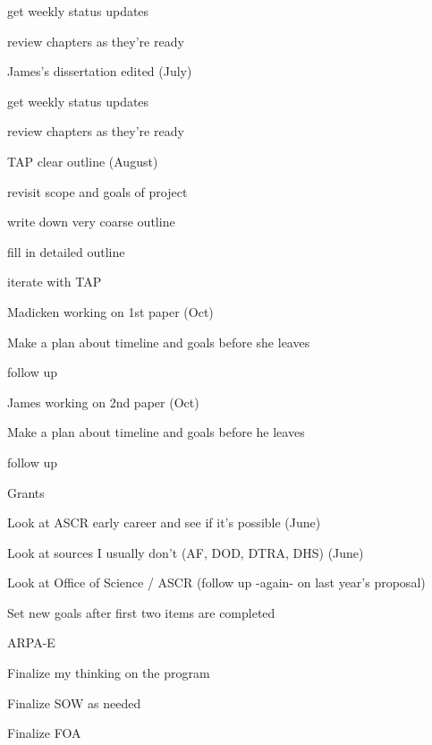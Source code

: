 \documentclass[12pt,twoside]{article}
\begin{document}
\begin{compactitem}
\begin{compactitem}
\begin{compactitem}
     \item get weekly status updates
     \item review chapters as they're ready
     \end{compactitem}
  \item James's dissertation edited (July)
     \begin{compactitem}
     \item get weekly status updates
     \item review chapters as they're ready
     \end{compactitem}
  \item TAP clear outline (August)
     \begin{compactitem}
     \item revisit scope and goals of project
     \item write down very coarse outline
     \item fill in detailed outline
     \item iterate with TAP
     \end{compactitem}
  \item Madicken working on 1st paper (Oct)
     \begin{compactitem}
     \item Make a plan about timeline and goals before she leaves
     \item follow up
     \end{compactitem}
  \item James working on 2nd paper (Oct)
     \begin{compactitem}
     \item Make a plan about timeline and goals before he leaves
     \item follow up
     \end{compactitem}
  \end{compactitem}

\item Grants
  \begin{compactitem}
  \item Look at ASCR early career and see if it's possible (June)
  \item Look at sources I usually don't (AF, DOD, DTRA, DHS) (June)
  \item Look at Office of Science / ASCR (follow up -again- on last year's proposal)
  \item Set new goals after first two items are completed
  \end{compactitem}
 
\item ARPA-E
  \begin{compactitem}
  \item Finalize my thinking on the program
  \item Finalize SOW as needed
  \item Finalize FOA
  \end{compactitem}
\end{compactitem}
\end{document}
